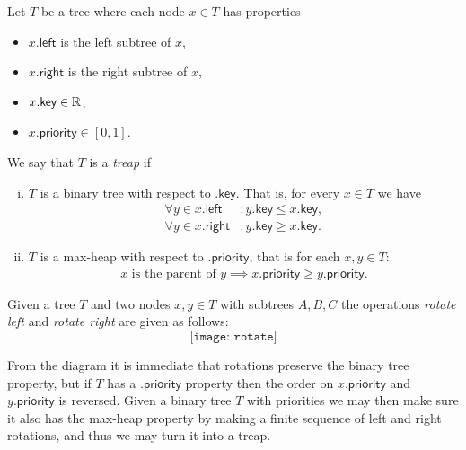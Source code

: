 \begin{defn}[Treap]
Let $T$ be a tree where each node $x \in T$ has properties
\begin{itemize}
    \item $x\textsf{.left}$ is the left subtree of $x$,
    \item $x\textsf{.right}$ is the right subtree of $x$,
    \item $x\textsf{.key} \in \mathbb{R}$,
    \item $x\textsf{.priority} \in [0,1]$.
\end{itemize}
We say that $T$ is a \textit{treap} if
\begin{enumerate}[(i)]
    \item $T$ is a binary tree with respect to $\textsf{.key}$. That is, for every $x \in T$ we have
    \begin{align*}
        \forall y \in x\textsf{.left} &\colon y\textsf{.key} \leq x\textsf{.key}, \\
        \forall y \in x\textsf{.right} &\colon y\textsf{.key} \geq x\textsf{.key}.
    \end{align*}
    \item $T$ is a max-heap with respect to $\textsf{.priority}$, that is for each $x, y \in T$:
    \begin{align*}
        x \text{ is the parent of } y \implies x\textsf{.priority} \geq y\textsf{.priority}.
    \end{align*}
\end{enumerate}
\end{defn}

\begin{defn}
Given a tree $T$ and two nodes $x, y \in T$ with subtrees $A, B, C$ the operations \textit{rotate left} and \textit{rotate right} are given as follows:
\[
    \texttt{[image: rotate]}
\]
\end{defn}

From the diagram it is immediate that rotations preserve the binary tree property, but if $T$ has a $\textsf{.priority}$ property then the order on $x\textsf{.priority}$ and $y\textsf{.priority}$ is reversed. Given a binary tree $T$ with priorities we may then make sure it also has the max-heap property by making a finite sequence of left and right rotations, and thus we may turn it into a treap.

